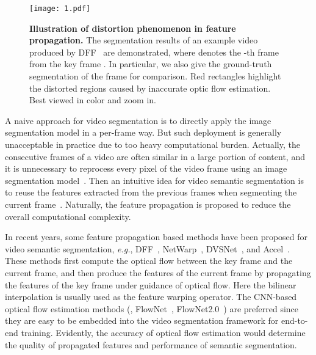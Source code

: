 \documentclass[journal]{IEEEtran}
\begin{document}
\begin{figure}[t]
	\begin{center}
		\texttt{[image: 1.pdf]}
	\end{center}
	\caption{\textbf{Illustration of distortion phenomenon in feature propagation.} The segmentation results of an example video produced by DFF~\cite{zhu2017deep} are demonstrated, where  denotes the -th frame from the key frame . In particular, we also give the ground-truth segmentation of the frame  for comparison. Red rectangles highlight the distorted regions caused by inaccurate optic flow estimation. Best viewed in color and zoom in.}
	\label{dff_distortion}
\end{figure}


A naive approach for video segmentation is to directly apply the image segmentation model in a per-frame way. But such deployment is generally unacceptable in practice due to too heavy computational burden. Actually, the consecutive frames of a video are often similar in a large portion of content, and it is unnecessary to reprocess every pixel of the video frame using an image segmentation model~\cite{xu2018dynamic}. Then an intuitive idea for video semantic segmentation is to reuse the features extracted from the previous frames when segmenting the current frame~\cite{zhu2017deep}. Naturally, the feature propagation is proposed to reduce the overall computational complexity.

\IEEEpubidadjcol

In recent years, some feature propagation based methods have been proposed for video semantic segmentation, \textit{e.g.}, DFF~\cite{zhu2017deep}, NetWarp~\cite{gadde2017semantic}, DVSNet~\cite{xu2018dynamic}, and Accel~\cite{jain2019accel}. These methods first compute the optical flow between the key frame and the current frame, and then produce the features of the current frame by propagating the features of the key frame under guidance of optical flow. Here the bilinear interpolation is usually used as the feature warping operator. The CNN-based optical flow estimation methods (\eg, FlowNet~\cite{dosovitskiy2015flownet,ilg2017flownet}, FlowNet2.0~\cite{ilg2017flownet}) are preferred since they are easy to be embedded into the video segmentation framework for end-to-end training. Evidently, the accuracy of optical flow estimation would determine the quality of propagated features and performance of semantic segmentation. 
\end{document}
